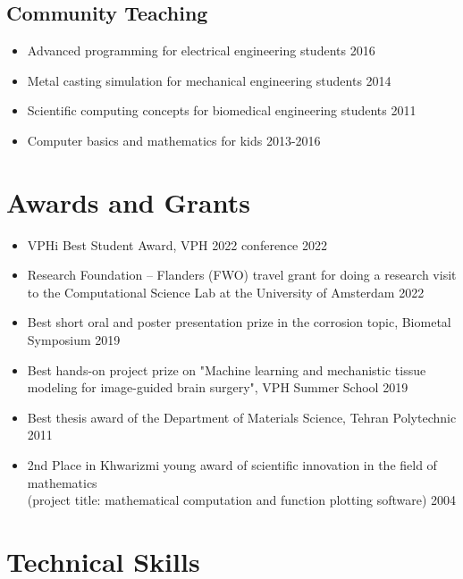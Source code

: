 \documentclass{cv}
\begin{document}
\subsection{Community Teaching}

\begin{itemize}[itemsep=-0.2ex]
\item
Advanced programming for electrical engineering students \hfill 2016
\item
Metal casting simulation for mechanical engineering students \hfill 2014
\item
Scientific computing concepts for biomedical engineering students \hfill 2011
\item
Computer basics and mathematics for kids \hfill 2013-2016
\end{itemize}



\section{Awards and Grants}

\begin{itemize}[itemsep=-0.2ex]
\item 
VPHi Best Student Award, VPH 2022 conference \hfill 2022
\item
Research Foundation – Flanders (FWO) travel grant for doing a research visit to the Computational Science Lab at the University of Amsterdam \hfill 2022
\item
Best short oral and poster presentation prize in the corrosion topic, Biometal Symposium \hfill 2019
\item
Best hands-on project prize on "Machine learning and mechanistic tissue modeling for image-guided brain surgery", VPH Summer School \hfill 2019
\item
Best thesis award of the Department of Materials Science, Tehran Polytechnic \hfill 2011
\item
2nd Place in Khwarizmi young award of scientific innovation in the field of mathematics\\(project title: mathematical computation and function plotting software) \hfill 2004
\end{itemize}




\section{Technical Skills}
\end{document}
